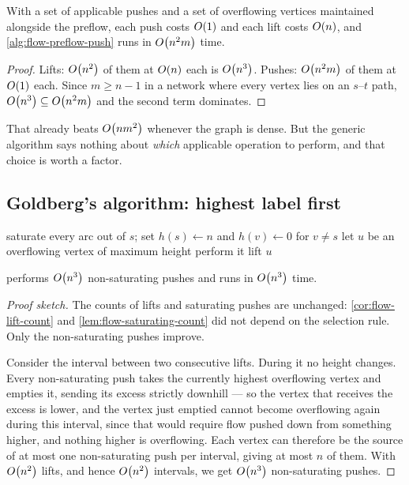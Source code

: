 \begin{theorem}\label{thm:flow-preflow-push-time}
With a set of applicable pushes and a set of overflowing vertices maintained
alongside the preflow, each push costs $O\!\left(1\right)$ and each lift costs
$O\!\left(n\right)$, and \cref{alg:flow-preflow-push} runs in $O\!\left(n^2m\right)$ time.
\end{theorem}

\begin{proof}
Lifts: $O\!\left(n^2\right)$ of them at $O\!\left(n\right)$ each is $O\!\left(n^3\right)$. Pushes:
$O\!\left(n^2m\right)$ of them at $O\!\left(1\right)$ each. Since $m \ge n-1$ in a network
where every vertex lies on an $s$--$t$ path, $O\!\left(n^3\right) \subseteq
O\!\left(n^2m\right)$ and the second term dominates.
\end{proof}

That already beats $O\!\left(nm^2\right)$ whenever the graph is dense. But the generic
algorithm says nothing about \emph{which} applicable operation to perform, and
that choice is worth a factor.

\subsection{Goldberg's algorithm: highest label first}

\begin{algorithm}[ht]
\caption{Goldberg's algorithm (highest label first)}
\label{alg:flow-goldberg}
\begin{algorithmic}[1]
  \State saturate every arc out of $s$; set $h(s) \gets n$ and
         $h(v) \gets 0$ for $v \ne s$
     \State let $u$ be an overflowing vertex of maximum height
         perform it
        \Else{} lift $u$
        \EndIf
     \EndWhile
  \EndWhile
\end{algorithmic}
\end{algorithm}

\begin{theorem}\label{thm:flow-goldberg}
 performs $O\!\left(n^3\right)$ non-saturating pushes and runs
in $O\!\left(n^3\right)$ time.
\end{theorem}

\begin{proof}[Proof sketch]
The counts of lifts and saturating pushes are unchanged:
\cref{cor:flow-lift-count} and \cref{lem:flow-saturating-count} did not depend
on the selection rule. Only the non-saturating pushes improve.

Consider the interval between two consecutive lifts. During it no height
changes. Every non-saturating push takes the currently highest overflowing
vertex and empties it, sending its excess strictly downhill --- so the vertex
that receives the excess is lower, and the vertex just emptied cannot become
overflowing again during this interval, since that would require flow pushed
down from something higher, and nothing higher is overflowing. Each vertex can
therefore be the source of at most one non-saturating push per interval, giving
at most $n$ of them. With $O\!\left(n^2\right)$ lifts, and hence $O\!\left(n^2\right)$
intervals, we get $O\!\left(n^3\right)$ non-saturating pushes.
\end{proof}


